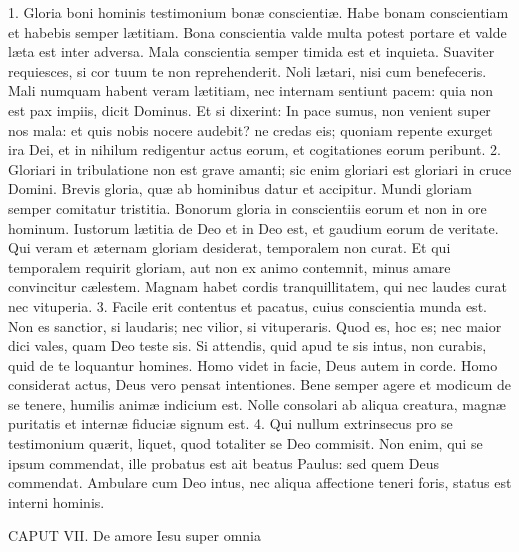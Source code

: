 1. Gloria boni hominis testimonium bonæ conscientiæ. Habe bonam conscientiam et habebis semper lætitiam. Bona conscientia valde multa potest portare et valde læta est inter adversa. Mala conscientia semper timida est et inquieta. Suaviter requiesces, si cor tuum te non reprehenderit. Noli lætari, nisi cum benefeceris. Mali numquam habent veram lætitiam, nec internam sentiunt pacem: quia non est pax impiis, dicit Dominus. Et si dixerint: In pace sumus, non venient super nos mala: et quis nobis nocere audebit? ne credas eis; quoniam repente exurget ira Dei, et in nihilum redigentur actus eorum, et cogitationes eorum peribunt.
2. Gloriari in tribulatione non est grave amanti; sic enim gloriari est gloriari in cruce Domini. Brevis gloria, quæ ab hominibus datur et accipitur. Mundi gloriam semper comitatur tristitia. Bonorum gloria in conscientiis eorum et non in ore hominum. Iustorum lætitia de Deo et in Deo est, et gaudium eorum de veritate. Qui veram et æternam gloriam desiderat, temporalem non curat. Et qui temporalem requirit gloriam, aut non ex animo contemnit, minus amare convincitur cælestem. Magnam habet cordis tranquillitatem, qui nec laudes curat nec vituperia.
3. Facile erit contentus et pacatus, cuius conscientia munda est. Non es sanctior, si laudaris; nec vilior, si vituperaris. Quod es, hoc es; nec maior dici vales, quam Deo teste sis. Si attendis, quid apud te sis intus, non curabis, quid de te loquantur homines. Homo videt in facie, Deus autem in corde. Homo considerat actus, Deus vero pensat intentiones. Bene semper agere et modicum de se tenere, humilis animæ indicium est. Nolle consolari ab aliqua creatura, magnæ puritatis et internæ fiduciæ signum est.
4. Qui nullum extrinsecus pro se testimonium quærit, liquet, quod totaliter se Deo commisit. Non enim, qui se ipsum commendat, ille probatus est ait beatus Paulus: sed quem Deus commendat. Ambulare cum Deo intus, nec aliqua affectione teneri foris, status est interni hominis.


CAPUT VII.
De amore Iesu super omnia

